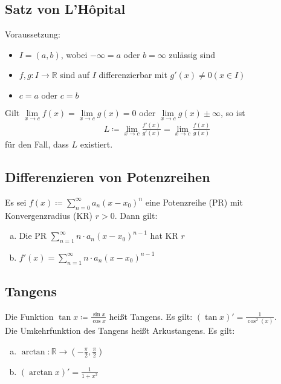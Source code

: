 \documentclass{article}
\begin{document}
\subsection{Satz von L'Hôpital}
Voraussetzung:
\begin{itemize}
    \item $I=(a,b)$, wobei $-\infty=a$ oder $b=\infty$ zulässig sind
    \item $f,g: I \to \mathbb{R}$ sind auf $I$ differenzierbar mit $g'(x) \neq 0 (x \in I)$
    \item $c=a \text{ oder } c=b$
\end{itemize}
Gilt $\lim \limits_{x \to c} f(x) = \lim \limits_{x \to c} g(x) = 0$ oder $\lim \limits_{x \to c} g(x) \pm \infty$, so ist 
\begin{align*}
    L \coloneqq \lim \limits_{x \to c} \frac{f'(x)}{g'(x)} =  \lim \limits_{x \to c} \frac{f(x)}{g(x)}
\end{align*}
für den Fall, dass $L$ existiert.

\subsection{Differenzieren von Potenzreihen}
Es sei $ f(x) \coloneqq \sum \limits_{n=0}^{\infty} a_n(x-x_0)^n$ eine Potenzreihe (PR) mit Konvergenzradius (KR) $r>0$. Dann gilt: \\
\begin{enumerate}[a)]
    \item Die PR $\sum \limits_{n=1}^{\infty} n \cdot a_n(x-x_0)^{n-1}$ hat KR $r$
    \item $f'(x) = \sum \limits_{n=1}^{\infty} n \cdot a_n(x-x_0)^{n-1}$
\end{enumerate}

\subsection{Tangens}
Die Funktion $\tan x \coloneqq \frac{\sin x}{\cos x}$ heißt Tangens. Es gilt: $(\tan x)' = \frac{1}{\cos^2(x)}$. \\
Die Umkehrfunktion des Tangens heißt Arkustangens. Es gilt: 
\begin{enumerate}[a)]
    \item $\arctan: \mathbb{R} \to (-\frac{\pi}{2},\frac{\pi}{2})$
    \item $(\arctan x)' = \frac{1}{1+x^2}$
\end{enumerate}
\end{document}
